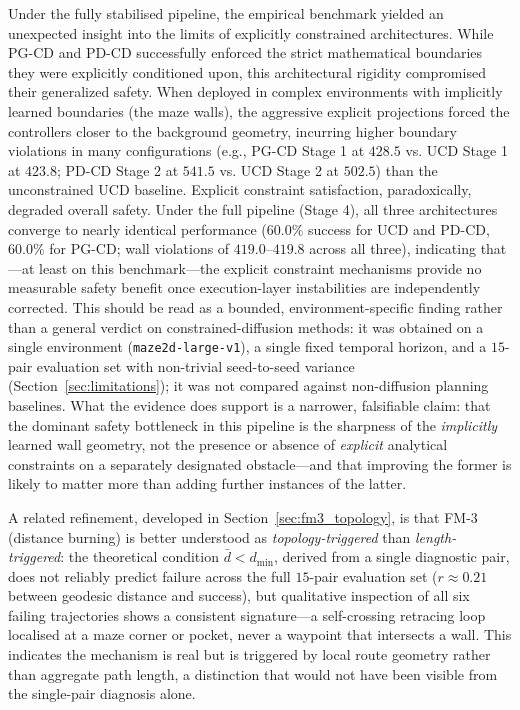 \documentclass[12pt, a4paper, oneside]{report}
\theoremstyle{definition}
\begin{document}
Under the fully stabilised pipeline, the empirical benchmark yielded an unexpected insight into the limits of explicitly constrained architectures. While PG-CD and PD-CD successfully enforced the strict mathematical boundaries they were explicitly conditioned upon, this architectural rigidity compromised their generalized safety. When deployed in complex environments with implicitly learned boundaries (the maze walls), the aggressive explicit projections forced the controllers closer to the background geometry, incurring higher boundary violations in many configurations (e.g., PG-CD Stage 1 at $428.5$ vs. UCD Stage 1 at $423.8$; PD-CD Stage 2 at $541.5$ vs. UCD Stage 2 at $502.5$) than the unconstrained UCD baseline. Explicit constraint satisfaction, paradoxically, degraded overall safety. Under the full pipeline (Stage 4), all three architectures converge to nearly identical performance ($60.0\%$ success for UCD and PD-CD, $60.0\%$ for PG-CD; wall violations of $419.0$--$419.8$ across all three), indicating that---at least on this benchmark---the explicit constraint mechanisms provide no measurable safety benefit once execution-layer instabilities are independently corrected. This should be read as a bounded, environment-specific finding rather than a general verdict on constrained-diffusion methods: it was obtained on a single environment (\texttt{maze2d-large-v1}), a single fixed temporal horizon, and a $15$-pair evaluation set with non-trivial seed-to-seed variance (Section~\ref{sec:limitations}); it was not compared against non-diffusion planning baselines. What the evidence does support is a narrower, falsifiable claim: that the dominant safety bottleneck in this pipeline is the sharpness of the \emph{implicitly} learned wall geometry, not the presence or absence of \emph{explicit} analytical constraints on a separately designated obstacle---and that improving the former is likely to matter more than adding further instances of the latter.

A related refinement, developed in Section~\ref{sec:fm3_topology}, is that FM-3 (distance burning) is better understood as \emph{topology-triggered} than \emph{length-triggered}: the theoretical condition $\bar{d} < d_{\min}$, derived from a single diagnostic pair, does not reliably predict failure across the full $15$-pair evaluation set ($r \approx 0.21$ between geodesic distance and success), but qualitative inspection of all six failing trajectories shows a consistent signature---a self-crossing retracing loop localised at a maze corner or pocket, never a waypoint that intersects a wall. This indicates the mechanism is real but is triggered by local route geometry rather than aggregate path length, a distinction that would not have been visible from the single-pair diagnosis alone.
\end{document}
